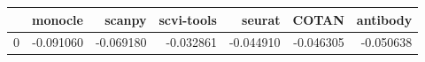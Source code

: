 \begin{tabular}{lrrrrrr}
\toprule
 & monocle & scanpy & scvi-tools & seurat & COTAN & antibody \\
\midrule
0 & -0.091060 & -0.069180 & -0.032861 & -0.044910 & -0.046305 & -0.050638 \\
\bottomrule
\end{tabular}
